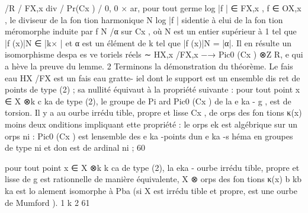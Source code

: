\documentclass[
  10pt,
]{article}
\newenvironment{Shaded}{}{}
\newcommand{\NormalTok}[1]{#1}
\begin{document}
\begin{Shaded}
\begin{Highlighting}[]
\NormalTok{                                  /R       / FX,x    div   / Pr(Cx )   / 0,}
\NormalTok{                           0}
\NormalTok{                                            ×}
\NormalTok{ ar, pour tout germe log |f | ∈ FX,x , f ∈ OX,x , le diviseur de la fon tion harmonique N log |f |}
\NormalTok{s\textquotesingle{}identie à elui de la fon tion méromorphe induite par f N /α sur Cx , où N est un entier}
\NormalTok{supérieur à 1 tel que |f (x)|N ∈ |k× | et α est un élément de k tel que |f (x)|N = |α|. Il en}
\NormalTok{résulte un isomorphisme d\textquotesingle{}espa es ve toriels réels}
\NormalTok{                                                 ∼}
\NormalTok{                                HX,x /FX,x −→ Pic0 (Cx ) ⊗Z R,}
\NormalTok{ e qui a hève la preuve du lemme.                                                                2}
\NormalTok{   Terminons la démonstration du théorème. Le fais eau HX /FX est un fais eau gratte{-} iel}
\NormalTok{dont le support est un ensemble dis ret de points de type (2) ; sa nullité équivaut à la propriété}
\NormalTok{suivante : pour tout point x ∈ X ⊗k c ka de type (2), le groupe de Pi ard Pic0 (Cx ) de la e   ka {-}}
\NormalTok{                                                                   g , est de torsion. Il y a au}
\NormalTok{ ourbe irrédu tible, propre et lisse Cx , de orps des fon tions κ(x)}
\NormalTok{moins deux onditions impliquant ette propriété :}
\NormalTok{    le orps ek est algébrique sur un orps ni : Pic0 (Cx ) est l\textquotesingle{}ensemble des e  ka {-}points d\textquotesingle{}un}
\NormalTok{     e}
\NormalTok{     ka {-}s héma en groupes de type ni et don est de ardinal ni ;}
\NormalTok{60}



\NormalTok{      pour tout point x ∈ X ⊗k k ca de type (2), la eka {-} ourbe irrédu tible, propre et lisse de}
\NormalTok{                           g est rationnelle  de manière équivalente, X ⊗}
\NormalTok{        orps des fon tions κ(x)                                             b kb}
\NormalTok{                                                                               ka est lo alement}
\NormalTok{       isomorphe à Pba (si X est irrédu tible et propre, \textquotesingle{}est une ourbe de Mumford ).}
\NormalTok{                     1}
\NormalTok{                     k}
\NormalTok{                                                                                              2}
\NormalTok{                                                                                              61}




\end{Highlighting}
\end{Shaded}
\end{document}
